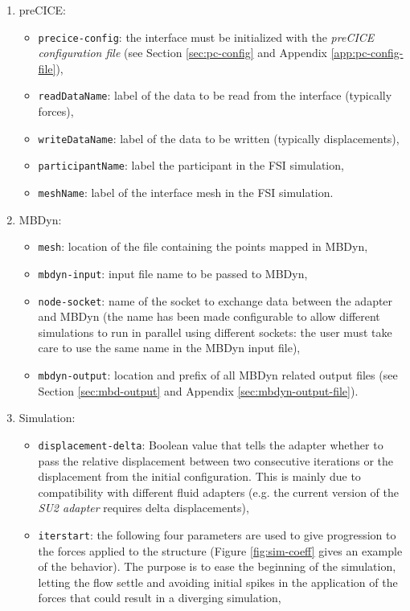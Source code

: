 \begin{enumerate}
    \item preCICE:
    \begin{itemize}
        \item \texttt{precice-config}: the interface must be initialized with the \textit{preCICE configuration file} (see Section \ref{sec:pc-config} and Appendix \ref{app:pc-config-file}),
        \item \texttt{readDataName}: label of the data to be read from the interface (typically forces),
        \item \texttt{writeDataName}: label of the data to be written (typically displacements),
        \item \texttt{participantName}: label the participant in the FSI simulation,
        \item \texttt{meshName}: label of the interface mesh in the FSI simulation.
    \end{itemize}
    \item MBDyn:
    \begin{itemize}
        \item \texttt{mesh}: location of the file containing the points mapped in MBDyn,
        \item \texttt{mbdyn-input}: input file name to be passed to MBDyn,
        \item \texttt{node-socket}: name of the socket to exchange data between the adapter and MBDyn (the name has been made configurable to allow different simulations to run in parallel using different sockets: the user must take care to use the same name in the MBDyn input file),
        \item \texttt{mbdyn-output}: location and prefix of all MBDyn related output files (see Section \ref{sec:mbd-output} and Appendix \ref{sec:mbdyn-output-file}).
    \end{itemize}
    \item Simulation:
    \begin{itemize}
        \item \texttt{displacement-delta}: Boolean value that tells the adapter whether to pass the relative displacement between two consecutive iterations or the displacement from the initial configuration. This is mainly due to compatibility with different fluid adapters (e.g. the current version of the \textit{SU2 adapter} requires delta displacements),  
        \item \texttt{iterstart}: the following four parameters are used to give progression to the forces applied to the structure (Figure \ref{fig:sim-coeff} gives an example of the behavior). The purpose is to ease the beginning of the simulation, letting the flow settle and avoiding initial spikes in the application of the forces that could result in a diverging simulation,

\end{itemize}
\end{enumerate}
